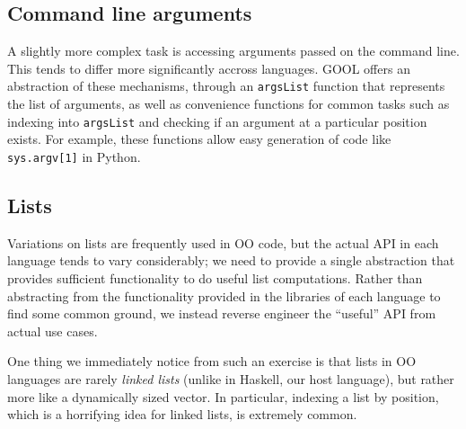 \documentclass[sigplan,review,anonymous,prologue,dvipsnames]{acmart}
\begin{document}
\subsection{Command line arguments}

A slightly more complex task is accessing arguments passed on the command
line. This tends to differ more significantly accross languages. GOOL
offers an abstraction of these mechanisms, through an \verb|argsList| function
that represents the list of arguments, as well as convenience functions for
common tasks such as indexing into \verb|argsList| and checking if an argument
at a particular position exists. For example, these functions allow easy 
generation of code like \verb|sys.argv[1]| in Python. 

\subsection{Lists}

Variations on lists are frequently used in OO code, but the actual API
in each language tends to vary considerably; we need to provide a single
abstraction that provides sufficient functionality to do useful list
computations.  Rather than abstracting from the functionality provided
in the libraries of each language to find some common ground, we instead
reverse engineer the ``useful'' API from actual use cases.  

One thing we immediately notice from such an exercise is that lists in
OO languages are rarely \emph{linked lists} (unlike in Haskell, our host
language), but rather more like a dynamically sized vector. In particular,
indexing a list by position, which is a horrifying idea for linked lists,
is extremely common.
\end{document}
